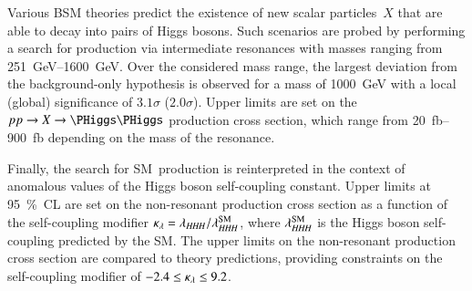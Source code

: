 Various BSM theories predict the existence of new scalar particles~$X$ that are
able to decay into pairs of Higgs bosons. Such scenarios are probed by
performing a search for \HH production via intermediate resonances with masses
ranging from \SIrange{251}{1600}{\GeV}. Over the considered mass range, the
largest deviation from the background-only hypothesis is observed for a mass of
\SI{1000}{\GeV} with a local (global) significance of $3.1\sigma$
($2.0\sigma$). Upper limits are set on the $\pp \to X \to \HH$ production cross
section, which range from \SIrange{20}{900}{\femto\barn} depending on the mass
of the resonance.

Finally, the search for SM~\HH production is reinterpreted in the context of
anomalous values of the Higgs boson self-coupling constant. Upper limits at
\SI{95}{\percent}~CL are set on the non-resonant \HH production cross section as
a function of the self-coupling modifier
$\kappa_{\lambda} = \lambda_{H\mkern-1.5muH\mkern-1.5muH} / \lambda_{H\mkern-1.5muH\mkern-1.5muH}^{\text{SM}}$, where $\lambda_{H\mkern-1.5muH\mkern-1.5muH}^{\text{SM}}$
is the Higgs boson self-coupling predicted by the SM. The upper limits on the
non-resonant \HH production cross section are compared to theory predictions,
providing constraints on the self-coupling modifier of
$\num{-2.4} \leq \kappa_{\lambda} \leq 9.2$.


